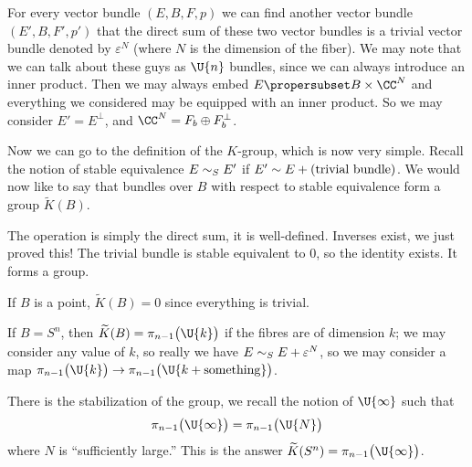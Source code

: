 For every vector bundle $(E,B,F,p)$ we can find another vector
bundle $(E',B,F',p')$ that the direct sum of these two vector
bundles is a trivial vector bundle denoted by $\varepsilon^{N}$
(where $N$ is the dimension of the fiber). We may note that we
can talk about these guys as $\U{n}$ bundles, since we can always
introduce an inner product. Then we may always embed
$E\propersubset B\times\CC^{N}$ and everything we considered may
be equipped with an inner product. So we may consider
$E'=E^{\bot}$, and $\CC^{N}=F_{b}\oplus F_{b}^{\bot}$.

Now we can go to the definition of the $K$-group, which is now
very simple. Recall the notion of stable equivalence $E\sim_{S}
E'$ if $E'\sim E+(\mbox{trivial bundle})$. We would now
like to say that bundles over $B$ with respect to stable
equivalence form a group $\widetilde{K}(B)$.

The operation is simply the direct sum, it is
well-defined. Inverses exist, we just proved this! The trivial
bundle is stable equivalent to 0, so the identity exists. It
forms a group.
\begin{ex}
If $B$ is a point, $\widetilde{K}(B)=0$ since everything is trivial.
\end{ex}
\begin{ex}
If $B=S^{n}$, then $\widetilde{K}(B)=\pi_{n-1}\bigl(\U{k}\bigr)$
if the fibres are of dimension $k$; we may consider any value of
$k$, so really we have $E\sim_{S} E+\varepsilon^{N}$, so we may
consider a map
$\pi_{n-1}\bigl(\U{k}\bigr)\to\pi_{n-1}\bigl(\U{k+\mbox{something}}\bigr)$.

There is the stabilization of the group, we recall the notion of
$\U{\infty}$\index{$\U{\infty}$} such that 
\[
\pi_{n-1}\bigl(\U{\infty}\bigr)=\pi_{n-1}\bigl(\U{N}\bigr)
\]
where $N$ is ``sufficiently large.'' This is the answer
$\widetilde{K}(S^{n})=\pi_{n-1}\bigl(\U{\infty}\bigr)$. 
\end{ex}


